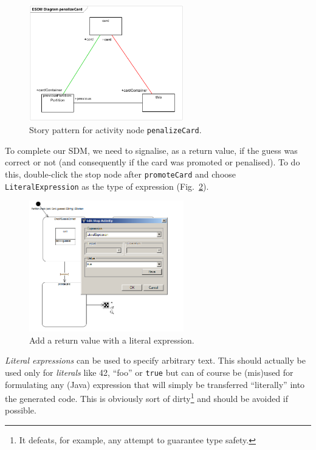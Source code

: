 \begin{figure}[htbp]
\begin{center}
  \includegraphics[width=0.6\textwidth]{pics/sdmBilder/check/sdm38}
  \caption{Story pattern for activity node \texttt{penalizeCard}.}  
  \label{fig:sdm_check_complete_penalize}
\end{center}
\end{figure}

To complete our SDM, we need to signalise, as a return value, if the guess was
correct or not (and consequently if the card was promoted or penalised).  To do
this, double-click the stop node after \texttt{promoteCard} and choose
\texttt{LiteralExpression} as the type of expression
(Fig.~\ref{fig:sdm_check_literal_exp}).  

\begin{figure}[htbp]
\begin{center}
  \includegraphics[width=0.6\textwidth]{pics/sdmBilder/check/sdm39}
  \caption{Add a return value with a literal expression.}  
  \label{fig:sdm_check_literal_exp}
\end{center}
\end{figure}

\clearpage

\emph{Literal expressions} can be used
to specify arbitrary text.  This should actually be used only for
\emph{literals} like 42, ``foo'' or \texttt{true} but can of course be (mis)used
for formulating any (Java) expression that will simply be transferred
``literally'' into the  generated code. This is obviously sort of
dirty\footnote{It defeats, for example, any attempt to guarantee type safety.} 
and should be avoided if possible.
  
